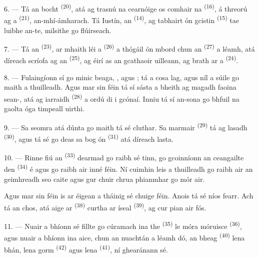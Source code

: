 6. --- Tá an  bocht \textsuperscript{(20)}, atá ag trasnú na cearnóige
os comhair na  \textsuperscript{(16)}, á threorú ag a
 \textsuperscript{(21)}, an-mhí-ámharach. Tá Iustín, an
 \textsuperscript{(14)}, ag tabhairt ón gcistin
 \textsuperscript{(15)} tae luibhe an-te, milsithe go flúirseach.

7. --- Tá an  \textsuperscript{(23)}, ar mhaith léi a
 \textsuperscript{(26)} a thógáil ón mbord chun an
 \textsuperscript{(27)} a léamh, atá díreach scríofa ag an
 \textsuperscript{(25)}, ag éirí as an gcathaoir uilleann, ag
brath ar a  \textsuperscript{(24)}.

8. --- Fulaingíonn sí go minic  beaga, ,
 agus ; tá a cosa lag, agus níl a súile
go maith a thuilleadh. Agus mar sin féin tá sí sásta a bheith ag magadh faoina
sean-, atá ag iarraidh  \textsuperscript{(28)} a
ordú di i gcónaí. Inniu tá sí an-sona go bhfuil na gaolta óga timpeall uirthi.

9. --- Sa seomra atá dúnta go maith tá sé cluthar. Sa  marmair
\textsuperscript{(29)} tá  ag lasadh \textsuperscript{(30)},
agus tá sé go deas sa  bog ón 
\textsuperscript{(31)} atá díreach lasta.

\VUsaut{4.2mm}
\VUsaut{3.0mm}

10. --- Rinne fiú an  \textsuperscript{(33)} dearmad go raibh sé
tinn, go gcoinníonn an  ceangailte den  \textsuperscript{(34)} é agus go raibh  air
inné féin. Ní cuimhin leis a thuilleadh go raibh  air an geimhreadh
seo caite agus gur chuir  chrua phianmhar go mór air.

Agus mar sin féin is ar éigean a tháinig sé chuige féin. Anois tá sé níos fearr.
Ach tá an chos, atá aige ar  \textsuperscript{(38)} curtha ar
 íseal \textsuperscript{(39)}, ag cur pian air fós.

11. --- Nuair a bhíonn sé fillte go cúramach ina  the
\textsuperscript{(35)} le  móra móruisce \textsuperscript{(36)},
agus nuair a bhíonn ina aice, chun an nuachtán a léamh dó, an 
bheag \textsuperscript{(40)} lena  bhán, lena  gorm
\textsuperscript{(42)} agus lena  \textsuperscript{(41)}, ní
ghearánann sé.

